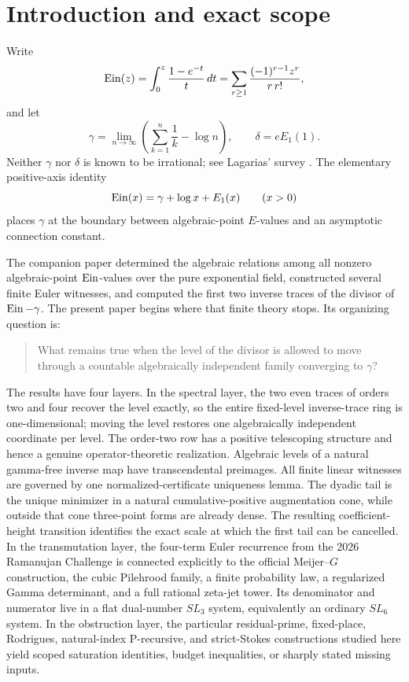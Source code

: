 \section{Introduction and exact scope}

Write
\[
 \operatorname{Ein}(z)=\int_0^z\frac{1-e^{-t}}t\,dt
 =\sum_{r\ge1}\frac{(-1)^{r-1}z^r}{r\,r!},
\]
and let
\[
 \gamma=\lim_{n\to\infty}\left(\sum_{k=1}^n\frac1k-\log n\right),
 \qquad
 \delta=eE_1(1).
\]
Neither \(\gamma\) nor \(\delta\) is known to be irrational; see
Lagarias' survey \cite{Lagarias2013}.  The elementary positive-axis identity
\begin{equation}\label{eq:Ein-connection}
 \operatorname{Ein}(x)=\gamma+\log x+E_1(x)\qquad(x>0)
\end{equation}
places \(\gamma\) at the boundary between algebraic-point \(E\)-values and an
asymptotic connection constant.

The companion paper \cite{KEIO2026I} determined the algebraic relations among
all nonzero algebraic-point \(\operatorname{Ein}\)-values over the pure exponential field,
constructed several finite Euler witnesses, and computed the first two
inverse traces of the divisor of \(\operatorname{Ein}-\gamma\).  The present paper begins
where that finite theory stops.  Its organizing question is:
\begin{quote}
What remains true when the level of the divisor is allowed to move through a
countable algebraically independent family converging to \(\gamma\)?
\end{quote}

The results have four layers.  In the spectral layer, the two even traces
of orders two and four
recover the level exactly, so the entire fixed-level inverse-trace ring is
one-dimensional; moving the level restores one algebraically
independent coordinate per level.  The order-two row has a positive
telescoping structure and hence a genuine operator-theoretic realization.
Algebraic levels of a natural gamma-free inverse map have
transcendental preimages.  All finite linear witnesses are governed by
one normalized-certificate uniqueness lemma.  The dyadic tail is the
unique minimizer in a natural cumulative-positive augmentation cone, while
outside that cone three-point forms are already dense.  The resulting
coefficient-height transition identifies the exact scale at which the first
tail can be cancelled.  In the transmutation layer, the four-term Euler
recurrence from the 2026 Ramanujan Challenge is connected explicitly to the
official Meijer--\(G\) construction, the cubic Pilehrood family, a finite
probability law, a regularized Gamma determinant, and a full rational
zeta-jet tower.  Its denominator and numerator live in a flat dual-number
\(SL_3\) system, equivalently an ordinary \(SL_6\) system.  In the
obstruction layer, the particular residual-prime,
fixed-place, Rodrigues, natural-index P-recursive, and strict-Stokes
constructions studied here yield scoped saturation identities, budget
inequalities, or sharply stated missing inputs.


